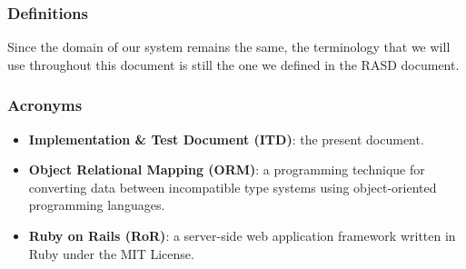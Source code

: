 \subsubsection{Definitions}

Since the domain of our system remains the same, the terminology that we will use throughout this document is still the one we defined in the RASD document.

\subsubsection{Acronyms}

\begin{itemize}
\item \textbf{Implementation \& Test Document (ITD)}: the present document.
\item \textbf{Object Relational Mapping (ORM)}: a programming technique for converting data between incompatible type systems using object-oriented programming languages.
\item \textbf{Ruby on Rails (RoR)}: a server-side web application framework written in Ruby under the MIT License.
\end{itemize}


